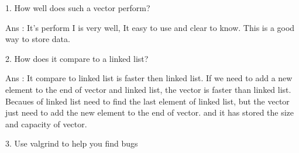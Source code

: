 \documentclass[10pt, answers]{exam}
\begin{document}
\begin{questions}
\begin{solution}
    1. How well does such a vector perform?
    
    Ans : It's perform I is very well, It easy to use and clear to know.
    This is a good way to store data.

    2. How does it compare to a linked list?

    Ans : It compare to linked list is faster then linked list.
    If we need to add a new element to the end of vector and linked list,
    the vector is faster than linked list.
    Becaues of linked list need to find the last element of linked list,
    but the vector just need to add the new element to the end of vector.
    and it has stored the size and capacity of vector.

    3. Use valgrind to help you find bugs

    \end{solution}
    
    
    
    \end{questions}
\end{document}
